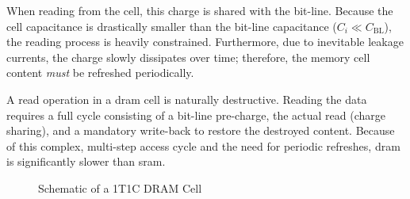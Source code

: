 When reading from the cell, this charge is shared with the bit-line. Because the cell capacitance is drastically smaller than the bit-line capacitance (\(C_i \ll C_{\text{BL}}\)), the reading process is heavily constrained. Furthermore, due to inevitable leakage currents, the charge slowly dissipates over time; therefore, the memory cell content \textit{must} be refreshed periodically. 

A read operation in a \gls{dram} cell is naturally destructive. Reading the data requires a full cycle consisting of a bit-line pre-charge, the actual read (charge sharing), and a mandatory write-back to restore the destroyed content. Because of this complex, multi-step access cycle and the need for periodic refreshes, \gls{dram} is significantly slower than \gls{sram}.

\begin{figure}[htbp]
    \centering
    \caption{Schematic of a 1T1C DRAM Cell}
    \label{fig:dram-cell}
\end{figure}

